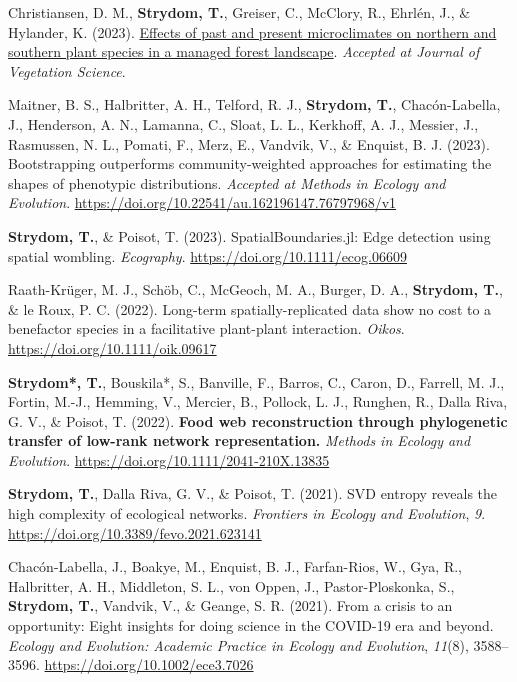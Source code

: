 \documentclass[11pt,a4paper,]{awesome-cv}
\newlength{\cslhangindent}
\newenvironment{CSLReferences}[2] %
 {%
  \setlength{\parindent}{0pt}
  \ifodd #1 \everypar{\setlength{\hangindent}{\cslhangindent}}\ignorespaces\fi
  \ifnum #2 > 0
  \setlength{\parskip}{#2\baselineskip}
  \fi
 }%
 {}
\begin{document}
\hypertarget{refs-journals}{}
\begin{CSLReferences}{1}{0}
\leavevmode{}%
Christiansen, D. M., \textbf{Strydom, T.}, Greiser, C., McClory, R.,
Ehrlén, J., \& Hylander, K. (2023). \href{}{Effects of past and present
microclimates on northern and southern plant species in a managed forest
landscape}. \emph{Accepted at Journal of Vegetation Science}.

\leavevmode{}%
Maitner, B. S., Halbritter, A. H., Telford, R. J., \textbf{Strydom, T.},
Chacón-Labella, J., Henderson, A. N., Lamanna, C., Sloat, L. L.,
Kerkhoff, A. J., Messier, J., Rasmussen, N. L., Pomati, F., Merz, E.,
Vandvik, V., \& Enquist, B. J. (2023). Bootstrapping outperforms
community-weighted approaches for estimating the shapes of phenotypic
distributions. \emph{Accepted at Methods in Ecology and Evolution}.
\url{https://doi.org/10.22541/au.162196147.76797968/v1}

\leavevmode{}%
\textbf{Strydom, T.}, \& Poisot, T. (2023). SpatialBoundaries.jl: Edge
detection using spatial wombling. \emph{Ecography}.
\url{https://doi.org/10.1111/ecog.06609}

\leavevmode{}%
Raath-Krüger, M. J., Schöb, C., McGeoch, M. A., Burger, D. A.,
\textbf{Strydom, T.}, \& le Roux, P. C. (2022). Long-term
spatially-replicated data show no cost to a benefactor species in a
facilitative plant-plant interaction. \emph{Oikos}.
\url{https://doi.org/10.1111/oik.09617}

\leavevmode{}%
\textbf{Strydom*, T.}, Bouskila*, S., Banville, F., Barros, C., Caron,
D., Farrell, M. J., Fortin, M.-J., Hemming, V., Mercier, B., Pollock, L.
J., Runghen, R., Dalla Riva, G. V., \& Poisot, T. (2022). \textbf{Food
web reconstruction through phylogenetic transfer of low-rank network
representation.}\textsuperscript{\clubsuit} \emph{Methods in Ecology and
Evolution}. \url{https://doi.org/10.1111/2041-210X.13835}

\leavevmode{}%
\textbf{Strydom, T.}, Dalla Riva, G. V., \& Poisot, T. (2021). SVD
entropy reveals the high complexity of ecological networks.
\emph{Frontiers in Ecology and Evolution}, \emph{9}.
\url{https://doi.org/10.3389/fevo.2021.623141}

\leavevmode{}%
Chacón-Labella, J., Boakye, M., Enquist, B. J., Farfan-Rios, W., Gya,
R., Halbritter, A. H., Middleton, S. L., von Oppen, J.,
Pastor-Ploskonka, S., \textbf{Strydom, T.}, Vandvik, V., \& Geange, S.
R. (2021). From a crisis to an opportunity: {Eight} insights for doing
science in the {COVID}-19 era and beyond. \emph{Ecology and Evolution:
Academic Practice in Ecology and Evolution}, \emph{11}(8), 3588--3596.
\url{https://doi.org/10.1002/ece3.7026}


\end{CSLReferences}
\end{document}

